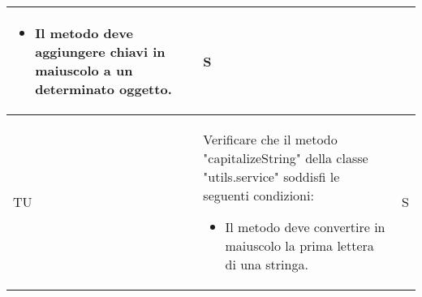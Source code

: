 \begin{adjustwidth}{-0.5cm}{-0.5cm}
\begin{longtable}{|P{1.5cm}|>{\raggedright}P{9.5cm}|>{\arraybackslash}P{1.5cm}|}
		\begin{itemize}
			\item Il metodo deve aggiungere chiavi in maiuscolo a un determinato oggetto.
    \end{itemize} & S \\
		\hline TU & Verificare che il metodo "capitalizeString" della classe "utils.service" soddisfi le seguenti condizioni:
		\begin{itemize}
			\item Il metodo deve convertire in maiuscolo la prima lettera di una stringa.
    \end{itemize} & S \\
	\end{longtable}
\end{adjustwidth}
\egroup
